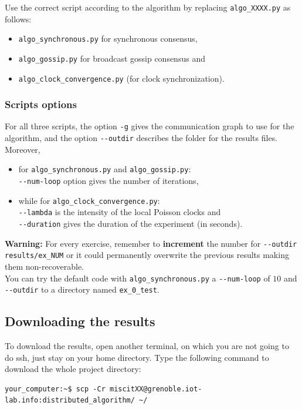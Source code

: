 \documentclass{article}
\begin{document}
Use the correct script according to the algorithm by replacing
\verb=algo_XXXX.py= as follows:
\begin{itemize}
    \item \verb=algo_synchronous.py= for synchronous consensus,
    \item \verb=algo_gossip.py= for broadcast gossip consensus and
    \item \verb=algo_clock_convergence.py= (for clock synchronization).
\end{itemize}

\subsubsection{Scripts options}

For all three scripts, the option \verb=-g= gives the communication graph to use for the algorithm,
and the option \verb=--outdir= describes the folder for the results files.\\

Moreover,
\begin{itemize}
    \item for \verb=algo_synchronous.py= and \verb=algo_gossip.py=:\\
        \verb=--num-loop= option gives the number of iterations,
    \item while for \verb=algo_clock_convergence.py=:\\
        \verb=--lambda= is the intensity of the local Poisson clocks and\\
        \verb=--duration= gives the duration of the experiment (in seconds).
\end{itemize}

\textbf{Warning:} For every exercise, remember to \textbf{increment} the number for \verb=--outdir results/ex_NUM=
or it could permanently overwrite the previous results making them non-recoverable.\\

You can try the default code with \verb=algo_synchronous.py= a \verb=--num-loop= of $10$ and
\verb=--outdir= to a directory named \verb=ex_0_test=.


\subsection{Downloading the results}

To download the results, open another terminal, on which you are not going to do ssh, just stay on your home directory.
Type the following command to download the whole project directory:
\begin{verbatim}
your_computer:~$ scp -Cr miscitXX@grenoble.iot-lab.info:distributed_algorithm/ ~/
\end{verbatim}
\end{document}
